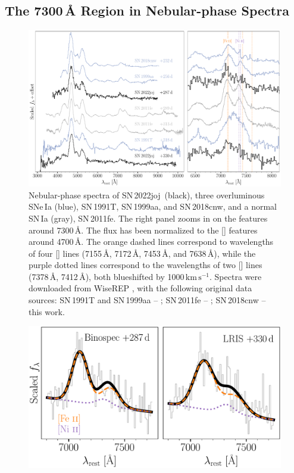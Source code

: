 \documentclass[twocolumn]{aastex631}
\newcommand{\sn}{SN\,2022joj}
\newcommand{\kms}{$\mathrm{km}\,\mathrm{s}^{-1}$}
\begin{document}
\begin{CJK*}{UTF8}{gbsn}
\subsection{The 7300\,\r{A} Region in Nebular-phase Spectra}
\label{sec:disc_nebular}
\begin{figure}
    \centering
    \includegraphics[width=\linewidth]{spec_comp_nebular.pdf}
    \caption{Nebular-phase spectra of \sn\ (black), three overluminous SNe\,Ia (blue), SN\,1991T, SN\,1999aa, and SN\,2018cnw, and a normal SN\,Ia (gray), SN\,2011fe. The right panel zooms in on the features around 7300\,\r{A}. The flux has been normalized to the [] features around 4700\,\r{A}. The orange dashed lines correspond to wavelengths of four [] lines (7155\,\r{A}, 7172\,\r{A}, 7453\,\r{A}, and 7638\,\r{A}), while the purple dotted lines correspond to the wavelengths of two [] lines (7378\,\r{A}, 7412\,\r{A}), both blueshifted by 1000\,\kms. Spectra were downloaded from WiseREP \citep{wiserep_2012}, with the following original data sources: SN\,1991T and SN\,1999aa -- \citet{Silverman_UCBIa_2012}; SN\,2011fe -- \citet{Mazzali_2015}; SN\,2018cnw -- this work.}
    \label{fig:nebular_spec}
\end{figure}
\begin{figure}
    \centering
    \includegraphics[width=\linewidth]{Fe_Ni.pdf}

\end{figure}
\end{CJK*}
\end{document}

